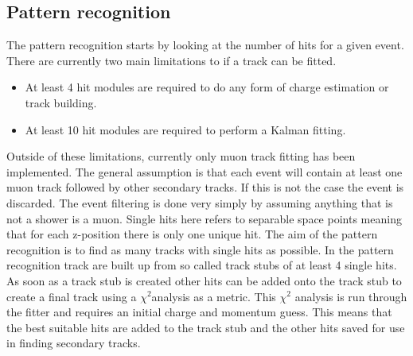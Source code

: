 
\subsection{Pattern recognition}
The pattern recognition starts by looking at the number of hits for a given event. There are currently two main limitations to if a track can be fitted.
\begin{itemize}
\item At least 4 hit modules are required to do any form of charge estimation or track building.
\item At least 10 hit modules are required to perform a Kalman fitting.
\end{itemize}
Outside of these limitations, currently only muon track fitting has been implemented. The general assumption is that each event will contain at least one muon track followed by other secondary tracks. If this is not the case the event is discarded. The event filtering is done very simply by assuming anything that is not a shower is a muon. Single hits here refers to separable space points meaning that for each z-position there is only one unique hit. The aim of the pattern recognition is to find as many tracks with single hits as possible. In the pattern recognition track are built up from so called track stubs of at least 4 single hits. As soon as a track stub is created other hits can be added onto the track stub to create a final track using a $\chi^2$analysis as a metric. This $\chi^2$ analysis is run through the fitter and requires an initial charge and momentum guess. This means that the best suitable hits are added to the track stub and the other hits saved for use in finding secondary tracks. 

